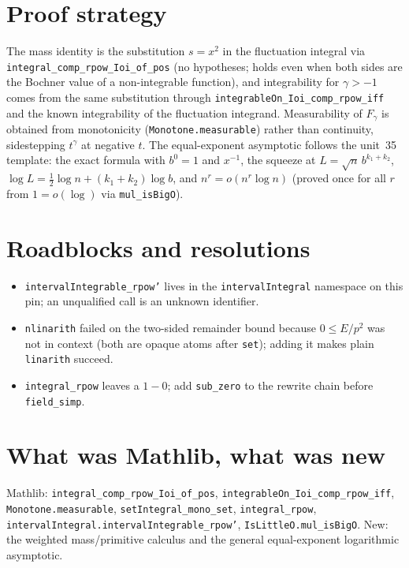 \documentclass[11pt]{article}
\begin{document}
\section{Proof strategy}
The mass identity is the substitution $s=x^2$ in the fluctuation integral via
\texttt{integral\_comp\_rpow\_Ioi\_of\_pos} (no hypotheses; holds even when both sides are the
Bochner value of a non-integrable function), and integrability for $\gamma>-1$ comes from the same
substitution through \texttt{integrableOn\_Ioi\_comp\_rpow\_iff} and the known integrability of the
fluctuation integrand. Measurability of $F_\gamma$ is obtained from monotonicity
(\texttt{Monotone.measurable}) rather than continuity, sidestepping $t^\gamma$ at negative $t$. The
equal-exponent asymptotic follows the unit~35 template: the exact formula with $b^0=1$ and
$x^{-1}$, the squeeze at $L=\sqrt n\,b^{k_1+k_2}$, $\log L=\tfrac12\log n+(k_1+k_2)\log b$, and
$n^{r}=o(n^r\log n)$ (proved once for all $r$ from $1=o(\log)$ via \texttt{mul\_isBigO}).

\section{Roadblocks and resolutions}
\begin{itemize}
\item \texttt{intervalIntegrable\_rpow'} lives in the \texttt{intervalIntegral} namespace on this
pin; an unqualified call is an unknown identifier.
\item \texttt{nlinarith} failed on the two-sided remainder bound because $0\le E/p^2$ was not in
context (both are opaque atoms after \texttt{set}); adding it makes plain \texttt{linarith} succeed.
\item \texttt{integral\_rpow} leaves a $1-0$; add \texttt{sub\_zero} to the rewrite chain before
\texttt{field\_simp}.
\end{itemize}

\section{What was Mathlib, what was new}
Mathlib: \texttt{integral\_comp\_rpow\_Ioi\_of\_pos}, \texttt{integrableOn\_Ioi\_comp\_rpow\_iff},
\texttt{Monotone.measurable}, \texttt{setIntegral\_mono\_set}, \texttt{integral\_rpow},
\texttt{intervalIntegral.intervalIntegrable\_rpow'}, \texttt{IsLittleO.mul\_isBigO}. New: the weighted
mass/primitive calculus and the general equal-exponent logarithmic asymptotic.
\end{document}
